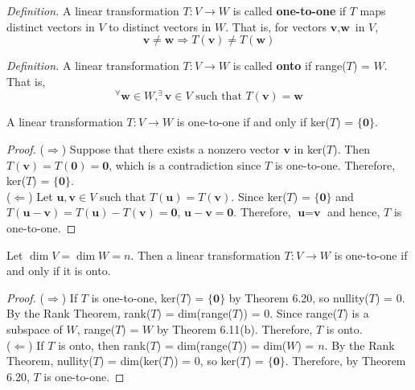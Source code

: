 \textit{Definition.} A linear transformation $T: V \rightarrow W$ is called \textbf{one-to-one} if $T$ maps distinct vectors in $V$ to distinct vectors in $W$. That is, for vectors $\textbf{v}, \textbf{w}$ in $V$, \begin{equation*}
	\textbf{v} \neq \textbf{w} \Rightarrow T(\textbf{v}) \neq T(\textbf{w})
\end{equation*}

\textit{Definition.} A linear transformation $T: V \rightarrow W$ is called \textbf{onto} if range($T$) = $W$. That is, \begin{equation*}
	^\forall \textbf{w} \in W, ^\exists \textbf{v} \in V \mbox{ such that } T(\textbf{v}) = \textbf{w}
\end{equation*}

\begin{theorem}
	A linear transformation $T: V \rightarrow W$ is one-to-one if and only if ker($T$) = $\{ \textbf{0} \}$.
\end{theorem}

\begin{proof}
	($\Rightarrow$) Suppose that there exists a nonzero vector $\textbf{v}$ in ker($T$). Then $T(\textbf{v}) = T(\textbf{0}) = \textbf{0}$, which is a contradiction since $T$ is one-to-one. Therefore, ker($T$) = $\{ \textbf{0} \}$. \\
	
	($\Leftarrow$) Let $\textbf{u}, \textbf{v} \in V$ such that $T(\textbf{u}) = T(\textbf{v})$. Since ker($T$) = $\{\textbf{0}\}$ and $T(\textbf{u} - \textbf{v}) = T(\textbf{u}) - T(\textbf{v}) = \textbf{0}$, $\textbf{u} - \textbf{v} = \textbf{0}$. Therefore, $\textbf{u} = \textbf{v}$ and hence, $T$ is one-to-one.
\end{proof}

\begin{theorem}
	Let $\dim V = \dim W = n$. Then a linear transformation $T: V \rightarrow W$ is one-to-one if and only if it is onto.
\end{theorem}

\begin{proof}
	($\Rightarrow$) If $T$ is one-to-one, ker($T$) = $\{ \textbf{0} \}$ by Theorem 6.20, so nullity($T$) = 0. By the Rank Theorem, rank($T$) = dim(range($T$)) = 0. Since range($T$) is a subspace of $W$, range($T$) = $W$ by Theorem 6.11(b). Therefore, $T$ is onto. \\
	
	($\Leftarrow$) If $T$ is onto, then rank($T$) = dim(range($T$)) = dim($W$) = $n$. By the Rank Theorem, nullity($T$) = dim(ker($T$)) = 0, so ker($T$) = $\{\textbf{0}\}$. Therefore, by Theorem 6.20, $T$ is one-to-one.
\end{proof}

